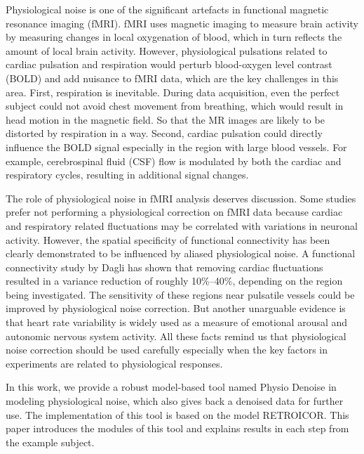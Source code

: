 Physiological noise is one of the significant artefacts in functional magnetic resonance imaging (fMRI).
fMRI uses magnetic imaging to measure brain activity by measuring changes in local oxygenation of blood,
which in turn reflects the amount of local brain activity. \cite{poldrack2011handbook}
However, physiological pulsations related to cardiac pulsation 
and respiration would perturb blood-oxygen level contrast (BOLD) and
add nuisance to fMRI data, 
which are the key challenges in this area. 
First, respiration is inevitable. 
During data acquisition, even the perfect subject could not avoid chest movement from breathing, 
which would result in head motion in the magnetic field. 
So that the MR images are likely to be distorted by respiration in a way.
Second, cardiac pulsation could directly influence the BOLD signal 
especially in the region with large blood vessels. 
For example, cerebrospinal fluid (CSF) flow is modulated 
by both the cardiac and respiratory cycles, resulting in additional signal changes. \cite{birn2012role}

The role of physiological noise in fMRI analysis deserves discussion. 
Some studies prefer not performing a physiological correction on fMRI data because cardiac and respiratory related fluctuations may be correlated with variations in neuronal activity. \cite{birn2012role} 
However, the spatial specificity of functional connectivity has been clearly demonstrated to be influenced by aliased physiological noise. \cite{lowe1998functional}
A functional connectivity study\cite{dagli1999localization} by Dagli has shown that removing cardiac fluctuations resulted in a variance reduction of roughly 10\%–40\%, 
depending on the region being investigated. \cite{dagli1999localization}
The sensitivity of these regions near pulsatile vessels could be improved by physiological noise correction. 
But another unarguable evidence is that heart rate variability is widely used as a measure of emotional arousal and autonomic nervous system activity. \cite{birn2012role} 
All these facts remind us that physiological noise correction should be used carefully especially when the key factors in experiments are related to physiological responses.

In this work, we provide a robust model-based tool named Physio Denoise in modeling physiological noise, which also gives back a denoised data for further use. 
The implementation of this tool is based on the model RETROICOR. \cite{glover2000image}
This paper introduces the modules of this tool and explains results in each step from the example subject.